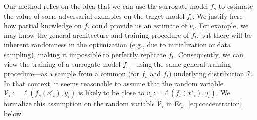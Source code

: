 Our method relies on the idea that we can use the surrogate model $f_s$ to estimate the value of some adversarial examples on the target model $f_t$. We justify here how partial knowledge on $f_t$ could provide us an estimate of $v_i$.
For example, we may know the general architecture and training procedure of $f_t$, but there will be inherent randomness in the optimization (e.g., due to initialization or data sampling), making it impossible to perfectly replicate $f_t$. 
Consequently, we can view the training of a surrogate model $f_s$---using the same general training procedure---as a sample from a common (for $f_s$ and $f_t$) underlying distribution $\mathcal T$. In that context, it seems reasonable to assume that the random variable $\mathcal{V}_i := \ell(f_s(x'_i),y_i)$ is likely to be close to $v_i := \ell(f_t(x'_i),y_i)$. We formalize this assumption on the random variable $\mathcal{V}_i$ in Eq.~\ref{eq:concentration} below.


